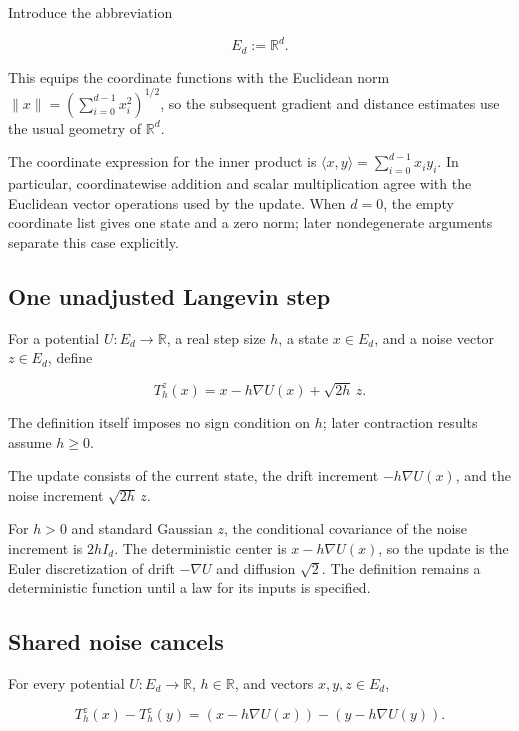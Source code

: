 \documentclass[11pt,a4paper]{article}
\begin{document}
Introduce the abbreviation

\[E_d:=\mathbb R^d.\]

This equips the coordinate functions with the Euclidean norm \(\|x\|=(\sum_{i=0}^{d-1}x_i^2)^{1/2}\), so the subsequent gradient and distance estimates use the usual geometry of \(\mathbb R^d\).



The coordinate expression for the inner product is \(\langle x,y\rangle=\sum_{i=0}^{d-1}x_iy_i\). In particular, coordinatewise addition and scalar multiplication agree with the Euclidean vector operations used by the update. When \(d=0\), the empty coordinate list gives one state and a zero norm; later nondegenerate arguments separate this case explicitly.


\subsection{\texorpdfstring{One unadjusted Langevin step}{One unadjusted Langevin step}}


For a potential \(U:E_d\to\mathbb R\), a real step size \(h\), a state \(x\in E_d\), and a noise vector \(z\in E_d\), define

\[T_h^z(x)=x-h\nabla U(x)+\sqrt{2h}\,z.\]

The definition itself imposes no sign condition on \(h\); later contraction results assume \(h\ge0\).



The update consists of the current state, the drift increment \(-h\nabla U(x)\), and the noise increment \(\sqrt{2h}\,z\).



For \(h>0\) and standard Gaussian \(z\), the conditional covariance of the noise increment is \(2hI_d\). The deterministic center is \(x-h\nabla U(x)\), so the update is the Euler discretization of drift \(-\nabla U\) and diffusion \(\sqrt2\). The definition remains a deterministic function until a law for its inputs is specified.


\subsection{\texorpdfstring{Shared noise cancels}{Shared noise cancels}}


For every potential \(U:E_d\to\mathbb R\), \(h\in\mathbb R\), and vectors \(x,y,z\in E_d\),

\[T_h^z(x)-T_h^z(y)=(x-h\nabla U(x))-(y-h\nabla U(y)).\]
\end{document}
